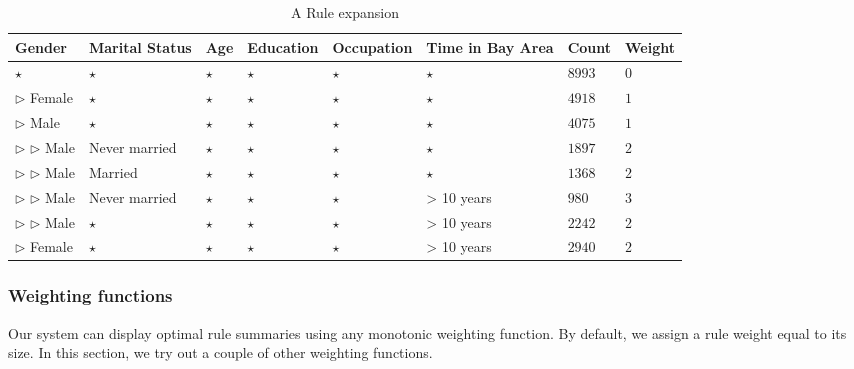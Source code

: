 \begin{table} 
\centering 
\begin{tabular}{| p{1.5cm} | p{1.5cm} | p{1.5cm} | p{1.5cm} | p{1.5cm} | p{1.5cm} | l | l |} 
\hline Gender & Marital Status & Age & Education & Occupation & Time in Bay Area & Count & Weight \\ \hline 
\cline{1-8} $\star$ & $\star$ & $\star$ & $\star$ & $\star$ & $\star$ & $8993$ & $0$ \\
\cline{1-1} \cline{2-2} \cline{3-3} \cline{4-4} \cline{5-5} \cline{6-6} \cline{7-8} $\triangleright$ Female & $\star$ & $\star$ & $\star$ & $\star$ & $\star$ & $4918$ & $1$ \\
\cline{1-1} \cline{2-2} \cline{3-3} \cline{4-4} \cline{5-5} \cline{6-6} \cline{7-8} $\triangleright$ Male & $\star$ & $\star$ & $\star$ & $\star$ & $\star$ & $4075$ & $1$ \\
\cline{2-2} \cline{3-3} \cline{4-4} \cline{5-5} \cline{6-6} \cline{7-8} $\triangleright$ $\triangleright$ Male & Never married & $\star$ & $\star$ & $\star$ & $\star$ & $1897$ & $2$ \\
\cline{2-2} \cline{3-3} \cline{4-4} \cline{5-5} \cline{6-6} \cline{7-8} $\triangleright$ $\triangleright$ Male & Married & $\star$ & $\star$ & $\star$ & $\star$ & $1368$ & $2$ \\
\cline{2-2} \cline{3-3} \cline{4-4} \cline{5-5} \cline{6-6} \cline{7-8} $\triangleright$ $\triangleright$ Male & Never married & $\star$ & $\star$ & $\star$ & > 10 years & $980$ & $3$ \\
\cline{2-2} \cline{3-3} \cline{4-4} \cline{5-5} \cline{6-6} \cline{7-8} $\triangleright$ $\triangleright$ Male & $\star$ & $\star$ & $\star$ & $\star$ & > 10 years & $2242$ & $2$ \\
\cline{1-1} \cline{2-2} \cline{3-3} \cline{4-4} \cline{5-5} \cline{6-6} \cline{7-8} $\triangleright$ Female & $\star$ & $\star$ & $\star$ & $\star$ & > 10 years & $2940$ & $2$ \\
\hline 
\end{tabular} 
\caption{A Rule expansion \label{table:uiexamplerule}} 
\end{table} 

\subsubsection{Weighting functions}
Our system can display optimal rule summaries using any monotonic weighting function. By default, we assign a rule weight equal to its size. In this section, we try out a couple of other weighting functions. 

